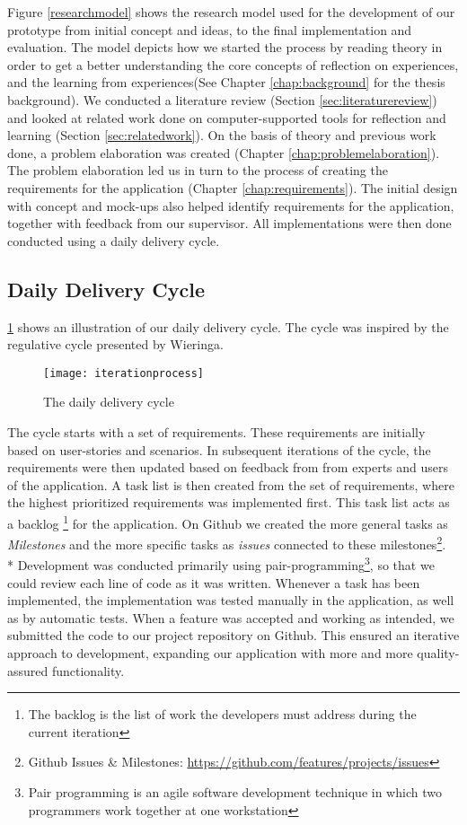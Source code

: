 Figure \ref{researchmodel} shows the research model used for the development of our prototype from initial concept and ideas, to the final implementation and evaluation. The model depicts how we started the process by reading theory in order to get a better understanding the core concepts of reflection on experiences, and the learning from experiences(See Chapter \ref{chap:background} for the thesis background). We conducted a literature review (Section \ref{sec:literaturereview}) and looked at related work done on computer-supported tools for reflection and learning (Section \ref{sec:relatedwork}). On the basis of theory and previous work done, a problem elaboration was created (Chapter \ref{chap:problemelaboration}). The problem elaboration led us in turn to the process of creating the requirements for the application (Chapter \ref{chap:requirements}). The initial design with concept and mock-ups also helped identify requirements for the application, together with feedback from our supervisor. All implementations were then done conducted using a daily delivery cycle.
\clearpage

\subsection{Daily Delivery Cycle}
\label{sec:dailydeliverycycle}

 \ref{iterationprocess} shows an illustration of our daily delivery cycle. The cycle was inspired by the regulative cycle presented by Wieringa\cite{wieringa}. 
\begin{figure}[!htpb]
\centering
	\texttt{[image: iterationprocess]}
\caption{The daily delivery cycle}
\label{iterationprocess}
\end{figure}

The cycle starts with a set of requirements. These requirements are initially based on user-stories and scenarios. In subsequent iterations of the cycle, the requirements were then updated based on feedback from from experts and users of the application. A task list is then created from the set of requirements, where the highest prioritized requirements was implemented first. This task list acts as a backlog 
\footnote{The backlog is the list of work the developers must address during the current iteration} for the application. On Github we created the more general tasks as \emph{Milestones} and the more specific tasks as \emph{issues} connected to these milestones\footnote{Github Issues \& Milestones: \url{https://github.com/features/projects/issues}}.\\* Development was conducted primarily using pair-programming\footnote{Pair programming is an agile software development technique in which two programmers work together at one workstation}, so that we could review each line of code as it was written. Whenever a task has been implemented, the implementation was tested manually in the application, as well as by automatic tests. When a feature was accepted and working as intended, we submitted the code to our project repository on Github.
This ensured an iterative approach to development, expanding our application with more and more quality-assured functionality. 

